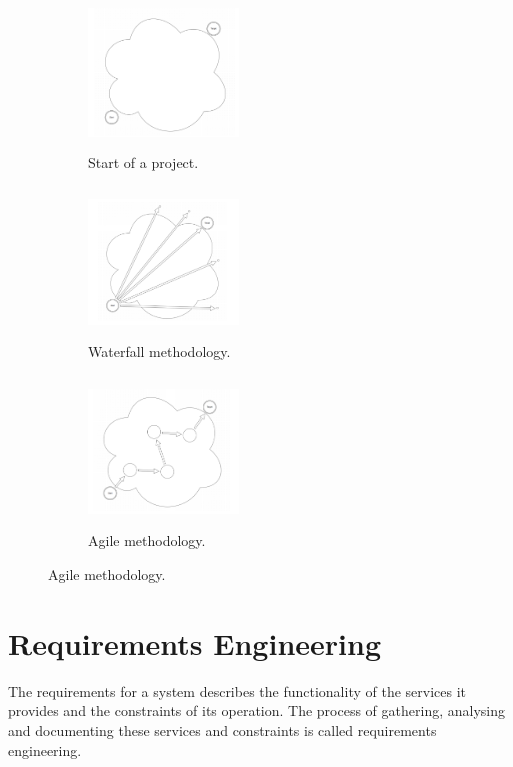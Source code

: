 \documentclass{l4proj}
\begin{document}
\begin{figure}[H]
\begin{subfigure}{.3\textwidth}
	\centering
	\includegraphics[height=4cm,width=4cm]{images/projectInitial}
	\caption{Start of a project.}
	\label{projectInitial}
\end{subfigure}
\begin{subfigure}{.3\textwidth}
	\centering
	\includegraphics[height=4cm,width=4cm]{images/projectStart}
	\caption{Waterfall methodology.}
	\label{projectStart}
\end{subfigure}
\begin{subfigure}{.3\textwidth}
	\centering
	\includegraphics[height=4cm,width=4cm]{images/projectAgile}
	\caption{Agile methodology.}
	\label{projectAgile}
\end{subfigure}
\end{figure}



\section{Requirements Engineering}

The requirements for a system describes the functionality of the services it provides and the constraints of its operation. The process of gathering, analysing and documenting these services and constraints is called requirements engineering.
\end{document}
